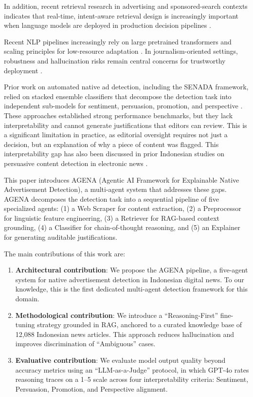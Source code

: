 \documentclass{ieeeaccess}
\begin{document}
In addition, recent retrieval research in advertising and sponsored-search contexts indicates that real-time, intent-aware retrieval design is increasingly important when language models are deployed in production decision pipelines \cite{b22}.

Recent NLP pipelines increasingly rely on large pretrained transformers and scaling principles for low-resource adaptation \cite{b15, b39}. In journalism-oriented settings, robustness and hallucination risks remain central concerns for trustworthy deployment \cite{b50, b55}.

Prior work on automated native ad detection, including the SENADA framework, relied on stacked ensemble classifiers that decompose the detection task into independent sub-models for sentiment, persuasion, promotion, and perspective \cite{b17, b19}. These approaches established strong performance benchmarks, but they lack interpretability and cannot generate justifications that editors can review. This is a significant limitation in practice, as editorial oversight requires not just a decision, but an explanation of why a piece of content was flagged. This interpretability gap has also been discussed in prior Indonesian studies on persuasive content detection in electronic news \cite{b21}.

This paper introduces AGENA (Agentic AI Framework for Explainable Native Advertisement Detection), a multi-agent system that addresses these gaps. AGENA decomposes the detection task into a sequential pipeline of five specialized agents: (1) a Web Scraper for content extraction, (2) a Preprocessor for linguistic feature engineering, (3) a Retriever for RAG-based context grounding, (4) a Classifier for chain-of-thought reasoning, and (5) an Explainer for generating auditable justifications.

The main contributions of this work are:
\begin{enumerate}
    \item \textbf{Architectural contribution}: We propose the AGENA pipeline, a five-agent system for native advertisement detection in Indonesian digital news. To our knowledge, this is the first dedicated multi-agent detection framework for this domain.
    \item \textbf{Methodological contribution}: We introduce a ``Reasoning-First'' fine-tuning strategy grounded in RAG, anchored to a curated knowledge base of 12,088 Indonesian news articles. This approach reduces hallucination and improves discrimination of ``Ambiguous'' cases.
    \item \textbf{Evaluative contribution}: We evaluate model output quality beyond accuracy metrics using an ``LLM-as-a-Judge'' protocol, in which GPT-4o rates reasoning traces on a 1--5 scale across four interpretability criteria: Sentiment, Persuasion, Promotion, and Perspective alignment.
\end{enumerate}
\end{document}
